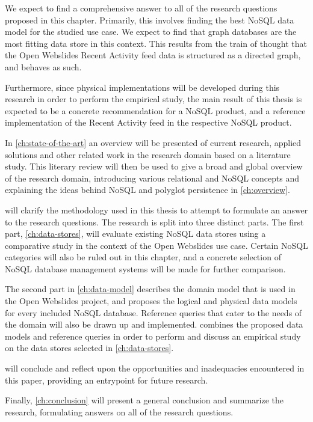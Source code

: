 We expect to find a comprehensive answer to all of the research questions proposed in this chapter.
Primarily, this involves finding the best NoSQL data model for the studied use case.
We expect to find that graph databases are the most fitting data store in this context.
This results from the train of thought that the Open Webslides Recent Activity feed data is structured as a directed graph, and behaves as such.

Furthermore, since physical implementations will be developed during this research in order to perform the empirical study, the main result of this thesis is expected to be a concrete recommendation for a NoSQL product, and a reference implementation of the Recent Activity feed in the respective NoSQL product.

In \cref{ch:state-of-the-art} an overview will be presented of current research, applied solutions and other related work in the research domain based on a literature study.
This literary review will then be used to give a broad and global overview of the research domain, introducing various relational and NoSQL concepts and explaining the ideas behind NoSQL and polyglot persistence in \cref{ch:overview}.

 will clarify the methodology used in this thesis to attempt to formulate an answer to the research questions.
The research is split into three distinct parts.
The first part, \cref{ch:data-stores}, will evaluate existing NoSQL data stores using a comparative study in the context of the Open Webslides use case.
Certain NoSQL categories will also be ruled out in this chapter, and a concrete selection of NoSQL database management systems will be made for further comparison.

The second part in \cref{ch:data-model} describes the domain model that is used in the Open Webslides project, and proposes the logical and physical data models for every included NoSQL database.
Reference queries that cater to the needs of the domain will also be drawn up and implemented.
 combines the proposed data models and reference queries in order to perform and discuss an empirical study on the data stores selected in \cref{ch:data-stores}.

 will conclude and reflect upon the opportunities and inadequacies encountered in this paper, providing an entrypoint for future research.

Finally, \cref{ch:conclusion} will present a general conclusion and summarize the research, formulating answers on all of the research questions.
